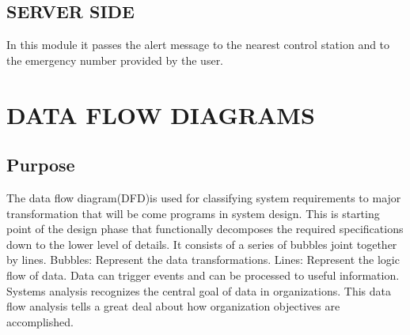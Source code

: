\documentclass[12pt,a4paper,oneside]{report}
\begin{document}
{\subsection{SERVER SIDE}
\par In this module it passes the alert message to the nearest control station and to the emergency number provided by the user.
\newpage



\newpage
\section{DATA FLOW DIAGRAMS}
\subsection {Purpose} 
\par The data ﬂow diagram(DFD)is used for classifying system requirements to major transformation that will be come programs in system design. This is starting point of the design phase that functionally decomposes the required specifications down to the lower level of details. It consists of a series of bubbles joint together by lines. Bubbles: Represent the data transformations. Lines: Represent the logic ﬂow of data. Data can trigger events and can be processed to useful information. Systems analysis recognizes the central goal of data in organizations. This data flow analysis tells a great deal about how organization objectives are accomplished.


}
\end{document}
